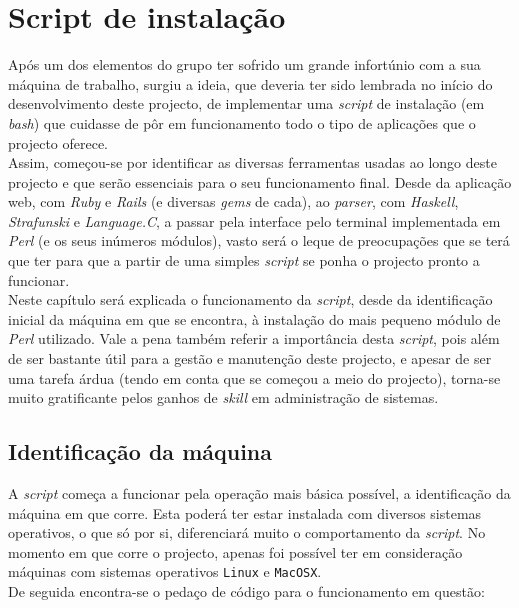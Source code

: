 \chapter{Script de instalação}\label{chap scriptinst}
Após um dos elementos do grupo ter sofrido um grande infortúnio com a sua máquina de trabalho, surgiu a ideia, que deveria ter sido lembrada no início do desenvolvimento deste projecto, 
de implementar uma \emph{script} de instalação (em \emph{bash}) que cuidasse de pôr em funcionamento todo o tipo de aplicações que o projecto oferece.\\

Assim, começou-se por identificar as diversas ferramentas usadas ao longo deste projecto e que serão essenciais para o seu funcionamento final. Desde da aplicação web, com \emph{Ruby} e 
\emph{Rails} (e diversas \emph{gems} de cada), ao \emph{parser}, com \emph{Haskell}, \emph{Strafunski} e \emph{Language.C}, a passar pela interface pelo terminal implementada em 
\emph{Perl} (e os seus inúmeros módulos), vasto será o leque de preocupações que se terá que ter para que a partir de uma simples \emph{script} se ponha o projecto pronto a funcionar.\\

Neste capítulo será explicada o funcionamento da \emph{script}, desde da identificação inicial da máquina em que se encontra, à instalação do mais pequeno módulo de \emph{Perl} utilizado.
Vale a pena também referir a importância desta \emph{script}, pois além de ser bastante útil para a gestão e manutenção deste projecto, e apesar de ser uma tarefa árdua (tendo em conta 
que se começou a meio do projecto), torna-se muito gratificante pelos ganhos de \emph{skill} em administração de sistemas.

\section{Identificação da máquina}

A \emph{script} começa a funcionar pela operação mais básica possível, a identificação da máquina em que corre. Esta poderá ter estar instalada com diversos sistemas operativos, o que 
só por si, diferenciará muito o comportamento da \emph{script}. No momento em que corre o projecto, apenas foi possível ter em consideração máquinas com sistemas operativos \texttt{Linux}
 e \texttt{MacOSX}.\\

De seguida encontra-se o pedaço de código para o funcionamento em questão:\\

